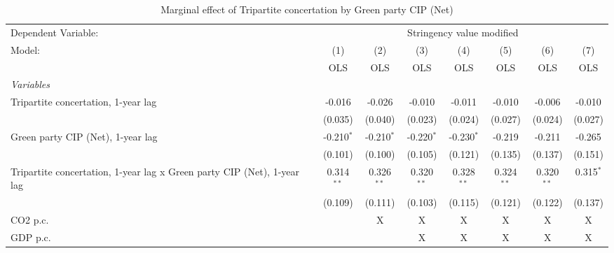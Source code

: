 
\begin{table}[htbp]
   \caption{Marginal effect of Tripartite concertation by Green party CIP (Net)}
   \centering
   \begin{tabular}{lccccccc}
      \toprule
      Dependent Variable: & \multicolumn{7}{c}{Stringency value modified}\\
      Model:                                                                  & (1)          & (2)          & (3)          & (4)          & (5)          & (6)          & (7)\\  
                                                                              &  OLS         & OLS          & OLS          & OLS          & OLS          & OLS          & OLS\\  
      \midrule
      \emph{Variables}\\
      Tripartite concertation, 1-year lag                                     & -0.016       & -0.026       & -0.010       & -0.011       & -0.010       & -0.006       & -0.010\\   
                                                                              & (0.035)      & (0.040)      & (0.023)      & (0.024)      & (0.027)      & (0.024)      & (0.027)\\   
      Green party CIP (Net), 1-year lag                                       & -0.210$^{*}$ & -0.210$^{*}$ & -0.220$^{*}$ & -0.230$^{*}$ & -0.219       & -0.211       & -0.265\\   
                                                                              & (0.101)      & (0.100)      & (0.105)      & (0.121)      & (0.135)      & (0.137)      & (0.151)\\   
      Tripartite concertation, 1-year lag x Green party CIP (Net), 1-year lag & 0.314$^{**}$ & 0.326$^{**}$ & 0.320$^{**}$ & 0.328$^{**}$ & 0.324$^{**}$ & 0.320$^{**}$ & 0.315$^{*}$\\   
                                                                              & (0.109)      & (0.111)      & (0.103)      & (0.115)      & (0.121)      & (0.122)      & (0.137)\\   
      CO2 p.c.                                                                &              & X            & X            & X            & X            & X            & X\\  
      GDP p.c.                                                                &              &              & X            & X            & X            & X            & X\\  

\end{tabular}
\end{table}
